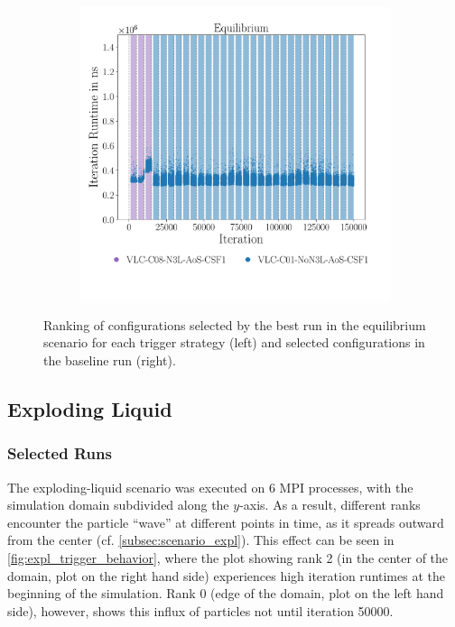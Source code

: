 \begin{figure}[htpb]
\begin{subfigure}{0.5\textwidth}
	\end{subfigure}%
	\begin{subfigure}{0.5\textwidth}
		\centering
		\includegraphics[width=\textwidth]{./Figures/plots/equilibrium_configs_static.pdf}
		\vspace*{-1.1cm}
	\end{subfigure}
	\caption{Ranking of configurations selected by the best run in the equilibrium scenario for each trigger strategy (left) and selected configurations in the baseline run (right).}
	\label{fig:equilibrium_optimality}
\end{figure}


\subsection{Exploding Liquid}
\subsubsection{Selected Runs}
The exploding-liquid scenario was executed on 6 MPI processes, with the simulation domain subdivided along the $y$-axis. As a result, different ranks encounter the particle \enquote{wave} at different points in time, as it spreads outward from the center (cf. \autoref{subsec:scenario_expl}). This effect can be seen in \autoref{fig:expl_trigger_behavior}, where the plot showing rank 2 (in the center of the domain, plot on the right hand side) experiences high iteration runtimes at the beginning of the simulation. Rank 0 (edge of the domain, plot on the left hand side), however, shows this influx of particles not until iteration \num{50000}.

